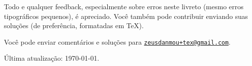 \vfill

	{

		\noindent \footnotesize Todo e qualquer feedback, especialmente sobre erros neste livreto (mesmo erros tipográficos pequenos), é apreciado. Você também pode contribuir enviando suas soluções (de preferência, formatadas em \TeX).
		
		\noindent Você pode enviar comentários e soluções para \href{mailto:zeusdanmou+tex@gmail.com}{\texttt{zeusdanmou+tex@gmail.com}}.
		
		\noindent Última atualização: \today.

}

